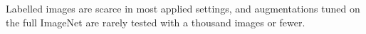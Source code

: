 Labelled images are scarce in most applied settings, and augmentations tuned on the full ImageNet
are rarely tested with a thousand images or fewer.
